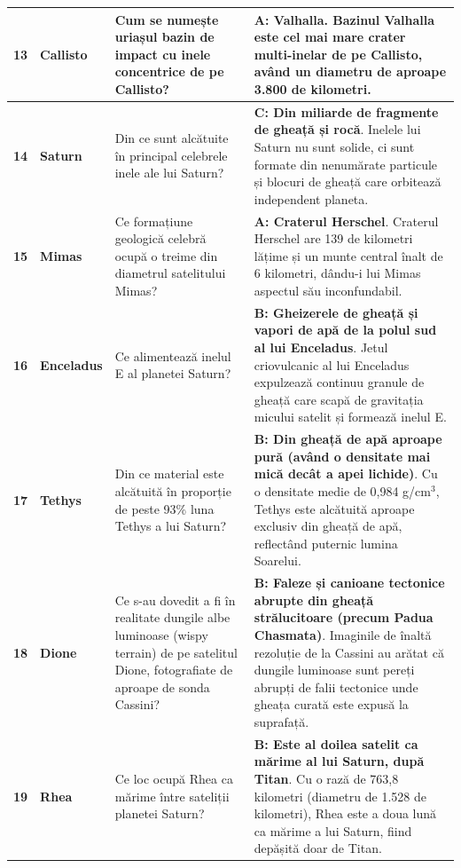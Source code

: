 \begin{longtable}{@{}r >{\raggedright\arraybackslash}p{2.7cm} >{\raggedright\arraybackslash}p{4.8cm} >{\raggedright\arraybackslash}p{6.5cm}@{}}
\textbf{13} & \textbf{Callisto} & Cum se numește uriașul bazin de impact cu inele concentrice de pe Callisto? & \textbf{A: Valhalla}. {\footnotesize Bazinul Valhalla este cel mai mare crater multi-inelar de pe Callisto, având un diametru de aproape 3.800 de kilometri.} \\ \midrule
\textbf{14} & \textbf{Saturn} & Din ce sunt alcătuite în principal celebrele inele ale lui Saturn? & \textbf{C: Din miliarde de fragmente de gheață și rocă}. {\footnotesize Inelele lui Saturn nu sunt solide, ci sunt formate din nenumărate particule și blocuri de gheață care orbitează independent planeta.} \\ \midrule
\textbf{15} & \textbf{Mimas} & Ce formațiune geologică celebră ocupă o treime din diametrul satelitului Mimas? & \textbf{A: Craterul Herschel}. {\footnotesize Craterul Herschel are 139 de kilometri lățime și un munte central înalt de 6 kilometri, dându-i lui Mimas aspectul său inconfundabil.} \\ \midrule
\textbf{16} & \textbf{Enceladus} & Ce alimentează inelul E al planetei Saturn? & \textbf{B: Gheizerele de gheață și vapori de apă de la polul sud al lui Enceladus}. {\footnotesize Jetul criovulcanic al lui Enceladus expulzează continuu granule de gheață care scapă de gravitația micului satelit și formează inelul E.} \\ \midrule
\textbf{17} & \textbf{Tethys} & Din ce material este alcătuită în proporție de peste 93\% luna Tethys a lui Saturn? & \textbf{B: Din gheață de apă aproape pură (având o densitate mai mică decât a apei lichide)}. {\footnotesize Cu o densitate medie de 0,984 g/cm$^3$, Tethys este alcătuită aproape exclusiv din gheață de apă, reflectând puternic lumina Soarelui.} \\ \midrule
\textbf{18} & \textbf{Dione} & Ce s-au dovedit a fi în realitate dungile albe luminoase (\guillemotleft{}wispy terrain\guillemotright{}) de pe satelitul Dione, fotografiate de aproape de sonda Cassini? & \textbf{B: Faleze și canioane tectonice abrupte din gheață strălucitoare (precum Padua Chasmata)}. {\footnotesize Imaginile de înaltă rezoluție de la Cassini au arătat că dungile luminoase sunt pereți abrupți de falii tectonice unde gheața curată este expusă la suprafață.} \\ \midrule
\textbf{19} & \textbf{Rhea} & Ce loc ocupă Rhea ca mărime între sateliții planetei Saturn? & \textbf{B: Este al doilea satelit ca mărime al lui Saturn, după Titan}. {\footnotesize Cu o rază de 763,8 kilometri (diametru de 1.528 de kilometri), Rhea este a doua lună ca mărime a lui Saturn, fiind depășită doar de Titan.} \\ \midrule

\end{longtable}
